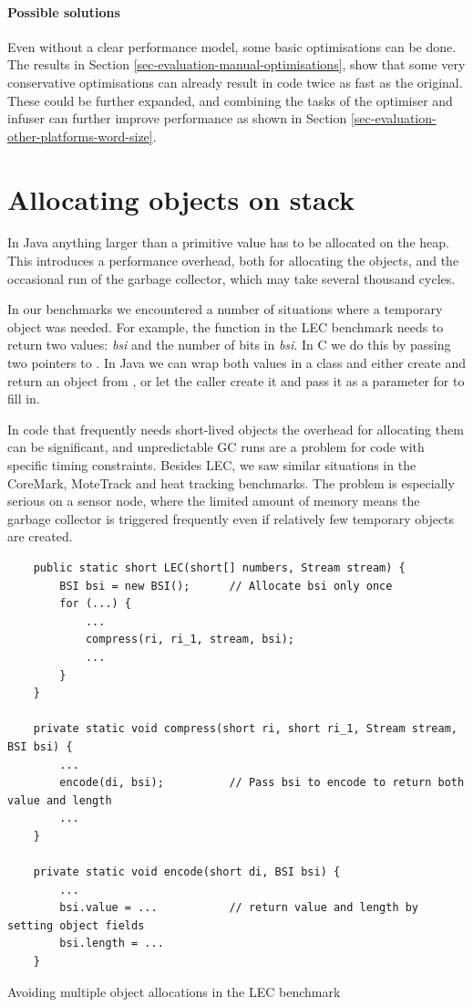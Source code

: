 \paragraph{Possible solutions}
Even without a clear performance model, some basic optimisations can be done. The results in Section \ref{sec-evaluation-manual-optimisations}, show that some very conservative optimisations can already result in code twice as fast as the original. These could be further expanded, and combining the tasks of the optimiser and infuser can further improve performance as shown in Section \ref{sec-evaluation-other-platforms-word-size}.




\section{Allocating objects on stack}
\label{sec-no-gc}
In Java anything larger than a primitive value has to be allocated on the heap. This introduces a performance overhead, both for allocating the objects, and the occasional run of the garbage collector, which may take several thousand cycles.

In our benchmarks we encountered a number of situations where a temporary object was needed. For example, the  function in the LEC benchmark needs to return two values: \emph{bsi} and the number of bits in \emph{bsi}. In C we do this by passing two pointers to . In Java we can wrap both values in a class and either create and return an object from , or let the caller create it and pass it as a parameter for  to fill in.

In code that frequently needs short-lived objects the overhead for allocating them can be significant, and unpredictable GC runs are a problem for code with specific timing constraints. Besides LEC, we saw similar situations in the CoreMark, MoteTrack and heat tracking benchmarks. The problem is especially serious on a sensor node, where the limited amount of memory means the garbage collector is triggered frequently even if relatively few temporary objects are created.

\begin{listing}[]
	\centering
	\begin{verbatim}
    public static short LEC(short[] numbers, Stream stream) {
        BSI bsi = new BSI();      // Allocate bsi only once
        for (...) {
            ...
            compress(ri, ri_1, stream, bsi);
            ...
        }
    }

    private static void compress(short ri, short ri_1, Stream stream, BSI bsi) {
        ...
        encode(di, bsi);          // Pass bsi to encode to return both value and length
        ...
    }

    private static void encode(short di, BSI bsi) {
        ...
        bsi.value = ...           // return value and length by setting object fields
        bsi.length = ...
    }
	\end{verbatim}
\caption{Avoiding multiple object allocations in the LEC benchmark}
\label{lst-lec-avoiding-object-allocations}
\end{listing}

